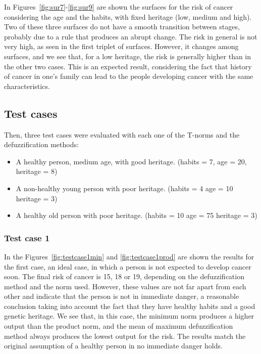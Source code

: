 \documentclass[conference]{IEEEtran}
\begin{document}
In Figures~\ref{fig:sur7}-\ref{fig:sur9} are shown the surfaces for the risk of cancer considering the age and the habits, with fixed heritage (low, medium and high). Two of these three surfaces do not have a smooth transition between stages, probably due to a rule that produces an abrupt change. The risk in general is not very high, as seen in the first triplet of surfaces. However, it changes among surfaces, and we see that, for a low heritage, the risk is generally higher than in the other two cases. This is an expected result, considering the fact that history of cancer in one's family can lead to the people developing cancer with the same characteristics.

\subsection{Test cases}
Then, three test cases were evaluated with each one of the T-norms and the defuzzification methods:
\begin{itemize}
    \item A healthy person, medium age, with good heritage. (habits = 7, age = 20, heritage = 8)
    \item A non-healthy young person with poor heritage. (habits = 4 age = 10 heritage = 3)
    \item A healthy old person with poor heritage. (habits = 10 age = 75 heritage = 3)
\end{itemize}

\subsubsection{Test case 1}
In the Figures~\ref{fig:testcase1min} and \ref{fig:testcase1prod} are shown the results for the first case, an ideal case, in which a person is not expected to develop cancer soon. The final risk of cancer is 15, 18 or 19, depending on the defuzzification method and the norm used. However, these values are not far apart from each other and indicate that the person is not in immediate danger, a reasonable conclusion taking into account the fact that they have healthy habits and a good genetic heritage. We see that, in this case, the minimum norm produces a higher output than the product norm, and the mean of maximum defuzzification method always produces the lowest output for the risk. The results match the original assumption of a healthy person in no immediate danger holds.

\end{document}
